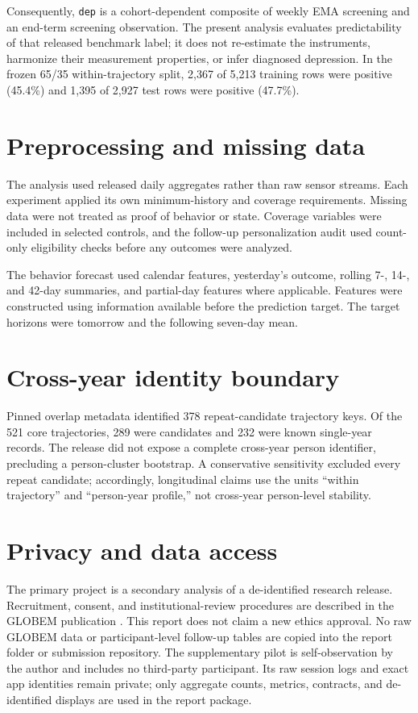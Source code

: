 \documentclass[a4paper,11pt,oneside]{report}
\begin{document}
Consequently, \texttt{dep} is a cohort-dependent composite of weekly EMA screening
and an end-term screening observation. The present analysis evaluates predictability
of that released benchmark label; it does not re-estimate the instruments, harmonize
their measurement properties, or infer diagnosed depression. In the frozen 65/35
within-trajectory split, 2,367 of 5,213 training rows were positive (45.4\%) and
1,395 of 2,927 test rows were positive (47.7\%).

\section{Preprocessing and missing data}

The analysis used released daily aggregates rather than raw sensor streams. Each
experiment applied its own minimum-history and coverage requirements. Missing data
were not treated as proof of behavior or state. Coverage variables were included in
selected controls, and the follow-up personalization audit used count-only
eligibility checks before any outcomes were analyzed.

The behavior forecast used calendar features, yesterday's outcome, rolling 7-, 14-,
and 42-day summaries, and partial-day features where applicable. Features were
constructed using information available before the prediction target. The target
horizons were tomorrow and the following seven-day mean.

\section{Cross-year identity boundary}

Pinned overlap metadata identified 378 repeat-candidate trajectory keys. Of the 521
core trajectories, 289 were candidates and 232 were known single-year records. The
release did not expose a complete cross-year person identifier, precluding a
person-cluster bootstrap. A conservative sensitivity excluded every repeat candidate;
accordingly, longitudinal claims use the units ``within trajectory'' and
``person-year profile,'' not cross-year person-level stability.

\section{Privacy and data access}

The primary project is a secondary analysis of a de-identified research release.
Recruitment, consent, and institutional-review procedures are described in the
GLOBEM publication \citep{xu2022globem}. This report does not claim a new ethics
approval. No raw GLOBEM data or participant-level follow-up tables are copied into
the report folder or submission repository. The supplementary pilot is
self-observation by the author and includes no third-party participant. Its raw
session logs and exact app identities remain private; only aggregate counts, metrics,
contracts, and de-identified displays are used in the report package.
\end{document}
